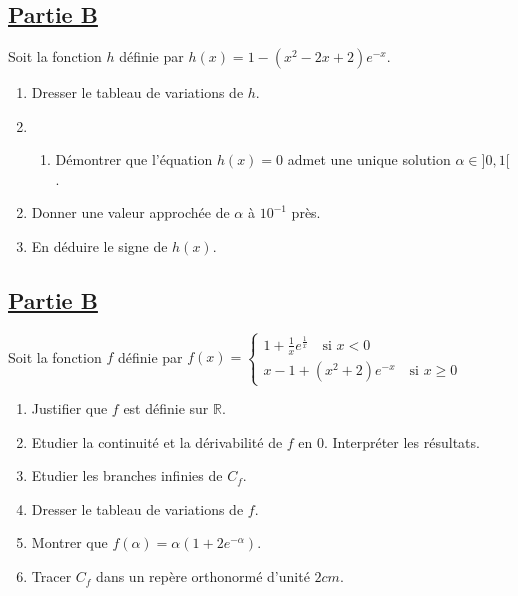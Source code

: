 \documentclass[12pt,a4paper]{article}
\begin{document}
\section*{}

\subsection*{\underline{\textbf{Partie B}}}

Soit la fonction \( h \) définie par \( h(x) = 1 - (x^2 - 2x + 2)e^{-x} \).

\begin{enumerate}
    \item Dresser le tableau de variations de \( h \).
    \item 
    \begin{enumerate}
        \item Démontrer que l’équation \( h(x) = 0 \) admet une unique solution \( \alpha \in ]0,1[ \).
    \end{enumerate}
\end{enumerate}

\begin{enumerate}
    \setcounter{enumi}{1}
    \item Donner une valeur approchée de \( \alpha \) à \( 10^{-1} \) près.
    \item En déduire le signe de \( h(x) \).
\end{enumerate}

\subsection*{\underline{\textbf{Partie B}}}

Soit la fonction \( f \) définie par  
\(
f(x) =
\begin{cases}
    1 + \frac{1}{x}e^{\frac{1}{x}}  \quad \text{si } x < 0 \\
    x - 1 + (x^2 + 2)e^{-x} \quad \text{si } x \geq 0
\end{cases}
\)

\begin{enumerate}
    \item Justifier que \( f \) est définie sur \( \mathbb{R} \).
    \item Etudier la continuité et la dérivabilité de \( f \) en \( 0 \).  
    Interpréter les résultats.
    \item Etudier les branches infinies de \( C_f \).
    \item Dresser le tableau de variations de \( f \).
    \item Montrer que \( f(\alpha) = \alpha (1 + 2e^{-\alpha}) \).
    \item Tracer \( C_f \) dans un repère orthonormé d’unité \( 2cm \).
\end{enumerate}
\end{document}
